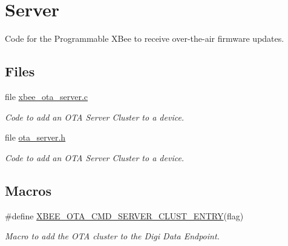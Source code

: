 \hypertarget{group__xbee__ota__server}{\section{Server}
\label{group__xbee__ota__server}
}


Code for the Programmable X\-Bee to receive over-\/the-\/air firmware updates.  


\subsection*{Files}
\begin{DoxyCompactItemize}
\item 
file \hyperlink{xbee__ota__server_8c}{xbee\-\_\-ota\-\_\-server.\-c}
\begin{DoxyCompactList}\small\item\em Code to add an O\-T\-A Server Cluster to a device. \end{DoxyCompactList}\item 
file \hyperlink{ota__server_8h}{ota\-\_\-server.\-h}
\begin{DoxyCompactList}\small\item\em Code to add an O\-T\-A Server Cluster to a device. \end{DoxyCompactList}\end{DoxyCompactItemize}
\subsection*{Macros}
\begin{DoxyCompactItemize}
\item 
\#define \hyperlink{group__xbee__ota__server_gacdc427d19ad192bd817194a74a8d7b08}{X\-B\-E\-E\-\_\-\-O\-T\-A\-\_\-\-C\-M\-D\-\_\-\-S\-E\-R\-V\-E\-R\-\_\-\-C\-L\-U\-S\-T\-\_\-\-E\-N\-T\-R\-Y}(flag)
\begin{DoxyCompactList}\small\item\em Macro to add the O\-T\-A cluster to the Digi Data Endpoint. \end{DoxyCompactList}\end{DoxyCompactItemize}

